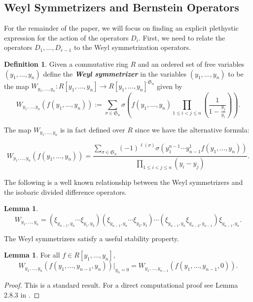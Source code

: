 \documentclass[12pt,reqno]{amsart}
\theoremstyle{definition}
\newtheorem{lem}[thm]{Lemma}
\newtheorem{defn}[thm]{Definition}
\begin{document}
\subsection{Weyl Symmetrizers and Bernstein Operators}

For the remainder of the paper, we will focus on finding an explicit plethystic expression for the action of the operators $D_i.$ First, we need to relate the operators $D_1,\ldots,D_{r-1}$ to the Weyl symmetrization operators.

\begin{defn}
    Given a commutative ring $R$ and an ordered set of free variables $(y_1,\ldots,y_n)$ define the \textbf{\textit{Weyl symmetrizer}} in the variables $(y_1,\ldots,y_n)$ to be the map $W_{y_1,\ldots,y_n}:R[y_1,\ldots,y_n] \rightarrow R[y_1,\ldots,y_n]^{\mathfrak{S}_n}$ given by 
    $$W_{y_1,\ldots,y_n}(f(y_1,\ldots,y_n)):= \sum_{\sigma \in \mathfrak{S}_n} \sigma \left( f(y_1,\ldots, y_n) \prod_{1 \leq i < j \leq n} \left( \frac{1}{1-\frac{y_j}{y_i}}\right) \right).$$
\end{defn}

The map $W_{y_1,\ldots,y_n}$ is in fact defined over $R$ since we have the alternative formula:

$$W_{y_1,\ldots,y_n}(f(y_1,\ldots,y_n)) = \frac{ \sum_{\sigma \in \mathfrak{S}_{n}} (-1)^{\ell(\sigma)} \sigma \left( y_1^{n-1}\cdots y_{n-1}^1 f(y_1,\ldots, y_n)  \right)}{\prod_{1\leq i< j \leq n} \left( y_i-y_j \right)}.$$


The following is a well known relationship between the Weyl symmetrizers and the isobaric divided difference operators.

\begin{lem}\label{Weyl sym is isobaric for longest word}
    $$W_{y_1,\ldots,y_n} = (\xi_{y_{n-1},y_n}\cdots \xi_{y_1,y_2})(\xi_{y_{n-1},y_n}\cdots \xi_{y_2,y_3})\cdots (\xi_{y_{n-1},y_n}\xi_{y_{n-2},y_{n-1}})\xi_{y_{n-1},y_n}.$$
\end{lem}

The Weyl symmetrizers satisfy a useful stability property.

\begin{lem}
    For all $f \in R[y_1,\ldots,y_n],$
    $$W_{y_1,\ldots,y_n}(f(y_1,\ldots,y_{n-1},y_n))|_{y_n=0} = W_{y_1,\ldots,y_{n-1}}(f(y_1,\ldots,y_{n-1},0)).$$
\end{lem}
\begin{proof}
    This is a standard result. For a direct computational proof see Lemma 2.8.3 in \cite{BWThesis}.
\end{proof}
\end{document}
